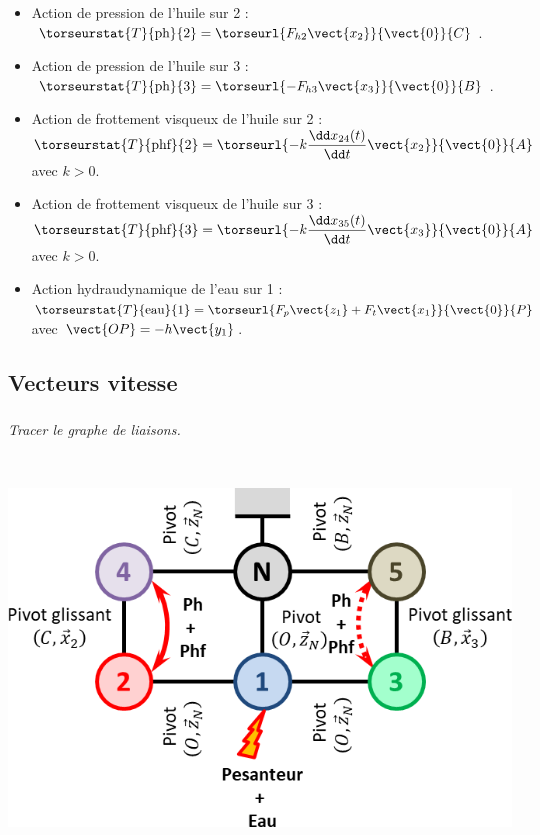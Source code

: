 \begin{multicols}{2}
\footnotesize
\begin{itemize}
\item Action de pression de l'huile sur 2 : $\torseurstat{T}{\text{ph}}{2}=\torseurl{F_{h2}\vect{x_2}}{\vect{0}}{C}$.
\item Action de pression de l'huile sur 3 : $\torseurstat{T}{\text{ph}}{3}=\torseurl{-F_{h3}\vect{x_3}}{\vect{0}}{B}$.
\item Action de frottement visqueux de l'huile sur 2 : $\torseurstat{T}{\text{phf}}{2}=\torseurl{-k\dfrac{\dd x_{24}(t)}{\dd t}\vect{x_2}}{\vect{0}}{A}$ avec $k>0$.
\item Action de frottement visqueux de l'huile sur 3 : $\torseurstat{T}{\text{phf}}{3}=\torseurl{-k\dfrac{\dd x_{35}(t)}{\dd t}\vect{x_3}}{\vect{0}}{A}$ avec $k>0$.
\item Action hydraudynamique de l'eau sur 1 : $\torseurstat{T}{\text{eau}}{1}=\torseurl{F_p\vect{z_1}+F_t\vect{x_1}}{\vect{0}}{P}$ avec $\vect{OP}=-h\vect{y_1}$.
\end{itemize}

\normalsize
%
%
%
%
%




\fi



\ifnormal

\subsection*{Vecteurs vitesse}

\subparagraph{}\textit{Tracer le graphe de liaisons.}
\ifprof
\begin{corrige} ~\\

\begin{center}
\includegraphics[width=.45\linewidth]{images/cor_01}
\end{center}
\end{corrige}
\else
\fi




\end{multicols}
